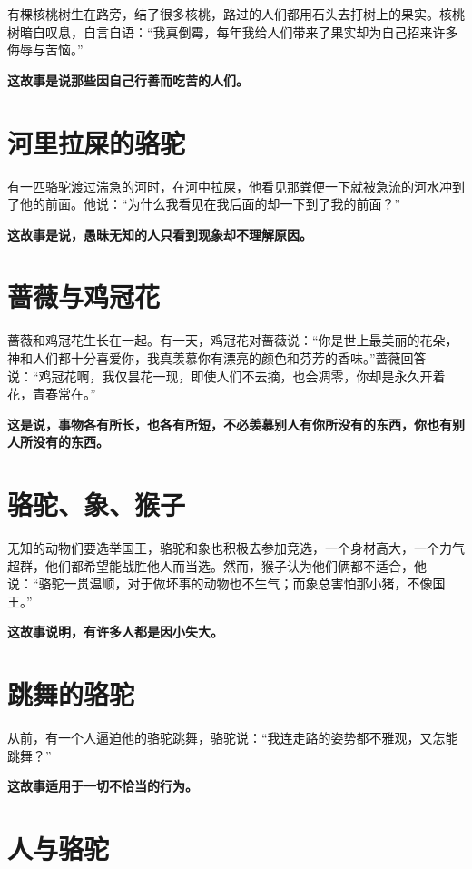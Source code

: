 有棵核桃树生在路旁，结了很多核桃，路过的人们都用石头去打树上的果实。核桃树暗自叹息，自言自语：“我真倒霉，每年我给人们带来了果实却为自己招来许多侮辱与苦恼。”

{\bfseries \color{red}这故事是说那些因自己行善而吃苦的人们。}

\section{河里拉屎的骆驼}

有一匹骆驼渡过湍急的河时，在河中拉屎，他看见那粪便一下就被急流的河水冲到了他的前面。他说：“为什么我看见在我后面的却一下到了我的前面？”

{\bfseries \color{red}这故事是说，愚昧无知的人只看到现象却不理解原因。}

\section{蔷薇与鸡冠花}

蔷薇和鸡冠花生长在一起。有一天，鸡冠花对蔷薇说：“你是世上最美丽的花朵，神和人们都十分喜爱你，我真羡慕你有漂亮的颜色和芬芳的香味。”蔷薇回答说：“鸡冠花啊，我仅昙花一现，即使人们不去摘，也会凋零，你却是永久开着花，青春常在。”

{\bfseries \color{red}这是说，事物各有所长，也各有所短，不必羡慕别人有你所没有的东西，你也有别人所没有的东西。}

\section{骆驼、象、猴子}

无知的动物们要选举国王，骆驼和象也积极去参加竞选，一个身材高大，一个力气超群，他们都希望能战胜他人而当选。然而，猴子认为他们俩都不适合，他说：“骆驼一贯温顺，对于做坏事的动物也不生气；而象总害怕那小猪，不像国王。”

{\bfseries \color{red}这故事说明，有许多人都是因小失大。}

\section{跳舞的骆驼}

从前，有一个人逼迫他的骆驼跳舞，骆驼说：“我连走路的姿势都不雅观，又怎能跳舞？”

{\bfseries \color{red}这故事适用于一切不恰当的行为。}

\section{人与骆驼}

